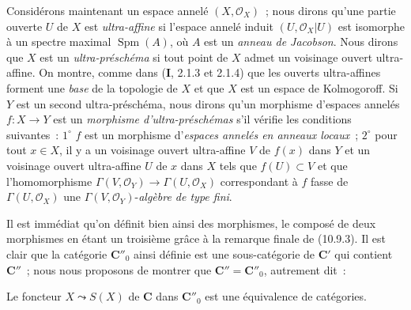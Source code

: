 
\begin{env}[10.9.5]
\label{IV.10.9.5-fr}
Considérons maintenant un espace annelé $(X,\mathcal O_X)$~; nous dirons qu'une
partie ouverte $U$ de $X$ est \emph{ultra-affine} si l'espace annelé induit
$(U,\mathcal O_X|U)$ est isomorphe à un spectre maximal
$\operatorname{Spm}(A)$, où $A$ est un \emph{anneau de Jacobson}. Nous dirons que $X$
est un \emph{ultra-préschéma} si tout point de $X$ admet un voisinage ouvert
ultra-affine. On montre, comme dans (\textbf I, 2.1.3 et 2.1.4) que les ouverts
ultra-affines forment une \emph{base} de la topologie de $X$ et que $X$ est un
espace de Kolmogoroff. Si $Y$ est un second ultra-préschéma, nous dirons qu'un
morphisme d'espaces annelés $f:X\to Y$ est un \emph{morphisme
d'ultra-préschémas} s'il vérifie les conditions suivantes~: $1^\circ$ $f$ est
un morphisme d'\emph{espaces annelés en anneaux locaux}~; $2^\circ$ pour tout $x\in X$,
il y a un voisinage ouvert ultra-affine $V$ de $f(x)$ dans $Y$ et un voisinage
ouvert ultra-affine $U$ de $x$ dans $X$ tels que $f(U)\subset V$ et que
l'homomorphisme
$\Gamma(V,\mathcal O_Y)\to\Gamma(U,\mathcal O_X)$ correspondant à $f$ fasse
de $\Gamma(U,\mathcal O_X)$ une $\Gamma(V,\mathcal O_Y)$-\emph{algèbre de type fini}.

Il est immédiat qu'on définit bien ainsi des morphismes, le composé de deux
morphismes en étant un troisième grâce à la remarque finale de (10.9.3). Il
est clair que la catégorie $\boldsymbol{C}''_0$ ainsi définie est une sous-catégorie
de $\boldsymbol{C}'$ qui contient $\boldsymbol{C}''$~; nous nous proposons de montrer que
$\boldsymbol{C}''=\boldsymbol{C}''_0$, autrement dit~:
\end{env}

\begin{proposition}[10.9.6]
\label{IV.10.9.6-fr}
Le foncteur $X\leadsto S(X)$ de $\boldsymbol{C}$ dans $\boldsymbol{C}''_0$ est une
équivalence de catégories.
\end{proposition}

